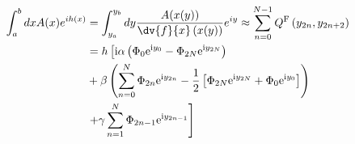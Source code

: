 \begin{equation}
    \begin{aligned}
        \int_{a}^{b}dxA(x)e^{ih(x)} &= \int_{y_a}^{y_b}dy\frac{A(x(y))}{\dv{f}{x}\left(x(y)\right)}e^{iy} \approx \sum_{n=0}^{N-1} Q^{\text {F}}\left(y_{2 n}, y_{2 n+2}\right) \\
        &= h\left[\mathrm{i} \alpha\left(\Phi_{0} \mathrm{e}^{\mathrm{i}  y_{0}}-\Phi_{2 N} \mathrm{e}^{\mathrm{i}  y_{2 N}}\right)\right.\\
        &+\beta\left(\sum_{n=0}^{N} \Phi_{2 n} \mathrm{e}^{\mathrm{i}  y_{2 n}}-\frac{1}{2}\left[\Phi_{2 N} \mathrm{e}^{\mathrm{i}  y_{2 N}}+\Phi_{0} \mathrm{e}^{\mathrm{i}  y_{0}}\right]\right) \\
        &\left.+\gamma \sum_{n=1}^{N} \Phi_{2 n-1} \mathrm{e}^{\mathrm{i}  y_{2 n-1}}\right] \\
    \end{aligned} \label{FilonVarQ}
\end{equation} 